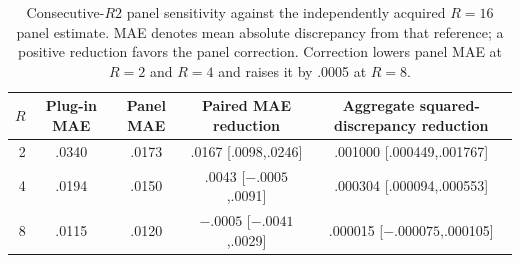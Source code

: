 \begin{table}[t]
\centering
\small
\setlength{\tabcolsep}{4.5pt}
\begin{tabular}{rcccc}
\toprule
$R$ & Plug-in MAE & Panel MAE & Paired MAE reduction &
Aggregate squared-discrepancy reduction \\
\midrule
2 & .0340 & .0173 & .0167 [.0098,.0246]
  & .001000 [.000449,.001767] \\
4 & .0194 & .0150 & .0043 [$-.0005$,.0091]
  & .000304 [.000094,.000553] \\
8 & .0115 & .0120 & $-.0005$ [$-.0041$,.0029]
  & .000015 [$-.000075$,.000105] \\
\bottomrule
\end{tabular}
\caption{Consecutive-$R2$ panel sensitivity against the independently
acquired $R=16$ panel estimate. MAE denotes mean absolute discrepancy from
that reference; a positive reduction favors the panel correction. Correction
lowers panel MAE at $R=2$ and $R=4$ and raises it by .0005 at $R=8$.}
\label{tab:supp_panel_sensitivity}
\end{table}
